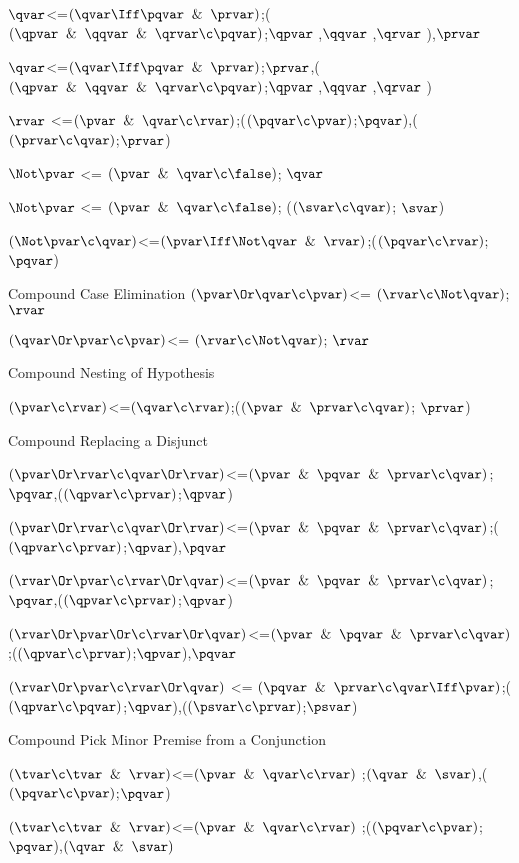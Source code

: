 $\qvar$<=$(\qvar \Iff \pqvar \And \prvar)$;($(\qpvar \And \qqvar \And \qrvar \c \pqvar)$;$\qpvar$ ,$\qqvar$ ,$\qrvar$ ),$\prvar$

$\qvar$<=$(\qvar \Iff \pqvar \And \prvar)$;$\prvar$,($(\qpvar \And \qqvar \And \qrvar \c \pqvar)$;$\qpvar$ ,$\qqvar$ ,$\qrvar$ )

$\rvar $ <=$(\pvar \And \qvar \c \rvar)$;($(\pqvar \c \pvar)$;$\pqvar$),($(\prvar\c\qvar)$;$\prvar$)

$\Not \pvar $ <= $(\pvar \And \qvar \c \false)$; $\qvar$

$\Not \pvar $ <= $(\pvar \And \qvar \c \false)$; ($(\svar \c \qvar)$; $\svar$)

$(\Not\pvar \c\qvar )$<=$(\pvar \Iff \Not\qvar \And \rvar)$;($(\pqvar \c \rvar)$;$\pqvar$)
\lineb

Compound Case Elimination 
\lineb
$( \pvar \Or \qvar \c \pvar)$<= $(\rvar \c \Not\qvar)$; $\rvar$

$( \qvar \Or \pvar \c \pvar)$<= $(\rvar \c \Not\qvar)$; $\rvar$
\lineb

Compound Nesting of Hypothesis
\lineb

$(\pvar \c\rvar )$<=$(\qvar \c \rvar)$;($(\pvar \And \prvar \c \qvar)$; $\prvar$)

Compound Replacing a Disjunct
\lineb


$(\pvar \Or \rvar \c \qvar \Or \rvar)$<=$(\pvar \And \pqvar \And \prvar \c \qvar)$;$\pqvar$,($(\qpvar \c \prvar)$;$\qpvar$)

$(\pvar \Or \rvar \c \qvar \Or \rvar)$<=$(\pvar \And \pqvar \And \prvar \c \qvar)$;($(\qpvar \c \prvar)$;$\qpvar$),$\pqvar$

$(\rvar \Or \pvar \c \rvar \Or \qvar)$<=$(\pvar \And \pqvar \And \prvar \c \qvar)$;$\pqvar$,($(\qpvar \c \prvar)$;$\qpvar$)

$(\rvar \Or \pvar \Or \c \rvar \Or \qvar)$<=$(\pvar \And \pqvar \And \prvar \c \qvar)$;($(\qpvar \c \prvar)$;$\qpvar$),$\pqvar$

$(\rvar \Or \pvar \c \rvar \Or \qvar)$ <= $(\pqvar\And\prvar\c\qvar \Iff\pvar)$;($(\qpvar \c \pqvar)$;$\qpvar$),($(\psvar \c \prvar)$;$\psvar$)

\lineb

Compound Pick Minor Premise from a Conjunction
\lineb

$(\tvar \c \tvar \And \rvar)$<=$(\pvar \And \qvar \c \rvar)$ ;$(\qvar \And \svar)$,($(\pqvar \c \pvar)$;$\pqvar$)

$(\tvar \c \tvar \And \rvar)$<=$(\pvar \And \qvar \c \rvar)$ ;($(\pqvar \c \pvar)$;$\pqvar$),$(\qvar \And \svar)$

